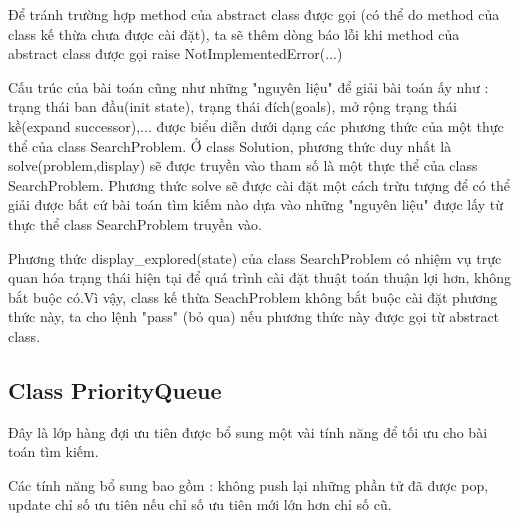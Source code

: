 \documentclass[11pt]{scrartcl} %
\begin{document}
Để tránh trường hợp method của abstract class được gọi (có thể do method của class kế thừa chưa được cài đặt), ta sẽ thêm dòng báo lỗi khi method của abstract class được gọi raise NotImplementedError(...)



Cấu trúc của bài toán cũng như những "nguyên liệu" để giải bài toán ấy như : trạng thái ban đầu(init state), trạng thái đích(goals), mở rộng trạng thái kề(expand successor)\cite{csttnt_lhb},... được biểu diễn dưới dạng các phương thức của một thực thể của class SearchProblem. Ở class Solution, phương thức duy nhất là solve(problem,display) sẽ được truyền vào tham số là một thực thể của class SearchProblem. Phương thức solve sẽ được cài đặt một cách trừu tượng để có thể giải được bất cứ bài toán tìm kiếm nào dựa vào những "nguyên liệu" được lấy từ thực thể class SearchProblem truyền vào.

Phương thức display\_explored(state) của class SearchProblem có nhiệm vụ trực quan hóa trạng thái hiện tại để quá trình cài đặt thuật toán thuận lợi hơn, không bắt buộc có.Vì vậy, class kế thừa SeachProblem không bắt buộc cài đặt phương thức này, ta cho lệnh "pass" (bỏ qua) nếu phương thức này được gọi từ abstract class.

\subsection{Class PriorityQueue}
Đây là lớp hàng đợi ưu tiên được bổ sung một vài tính năng để tối ưu cho bài toán tìm kiếm.

Các tính năng bổ sung bao gồm : không push lại những phần tử đã được pop, update chỉ số ưu tiên nếu chỉ số ưu tiên mới lớn hơn chỉ số cũ. 

\end{document}
